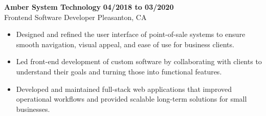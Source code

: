 \documentclass[letterpaper,11pt]{article}
\begin{document}
\vspace{4mm}
\textbf{Amber System Technology} \hfill \textbf{04/2018 to 03/2020} \\
Frontend Software Developer \hfill Pleasanton, CA
\begin{itemize}
    \item Designed and refined the user interface of point-of-sale systems to ensure smooth navigation, visual appeal, and ease of use
for business clients.
    \item Led front-end development of custom software by collaborating with clients to understand their goals and turning those into
functional features.
    \item Developed and maintained full-stack web applications that improved operational workflows and provided scalable long-term
solutions for small businesses.
\end{itemize}

\end{document}
